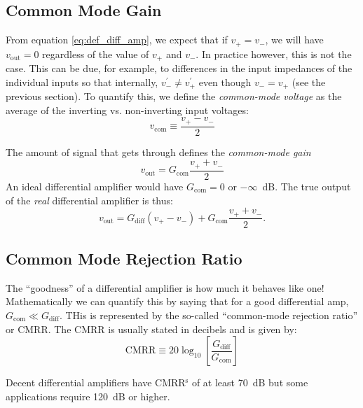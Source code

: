 \documentclass{tufte-book}
\begin{document}
\subsection{Common Mode Gain}
From equation \ref{eq:def_diff_amp}, we expect that if $v_+ = v_-$, we will have $v_\text{out} = 0$ regardless of the value of $v_+$ and $v_-$. In practice however, this is not the case. This can be due, for example, to differences in the input impedances of the individual inputs so that internally, $v_-^\prime \neq v_+^\prime$ even though $v_- = v_+$ (see the previous section). To quantify this, we define the \textit{common-mode voltage} as the average of the inverting vs. non-inverting input voltages:
\begin{equation}
\label{eq:common_mode_voltage}
v_\text{com} \equiv \frac{v_+-v_-}{2}
\end{equation}

The amount of signal that gets through defines the \textit{common-mode gain}
\begin{equation}
\label{eq:common_mode_gain}
v_\text{out} = G_\text{com}\frac{v_++v_-}{2}
\end{equation}
An ideal differential amplifier would have $G_\text{com} = 0$ or $-\infty$~dB. The true output of the \textit{real} differential amplifier is thus:
\begin{equation}
\label{eq:real_diff_amp}
v_\text{out} = G_\text{diff}\left(v_+-v_-\right) + G_\text{com}\frac{v_++v_-}{2}.
\end{equation}

\subsection{Common Mode Rejection Ratio}
The ``goodness'' of a differential amplifier is how much it behaves like one! Mathematically we can quantify this by saying that for a good differential amp, $G_\text{com} \ll G_\text{diff}$. THis is represented by the so-called ``common-mode rejection ratio'' or CMRR. The CMRR is usually stated in decibels and is given by:
\begin{equation}
\label{eq:def_CMRR}
\text{CMRR} \equiv 20\log_{10}\left[\frac{G_\text{diff}}{G_\text{com}}\right]
\end{equation}
 
Decent differential amplifiers have CMRR$^\text{s}$ of at least 70~dB but some applications require 120~dB or higher.
\end{document}
